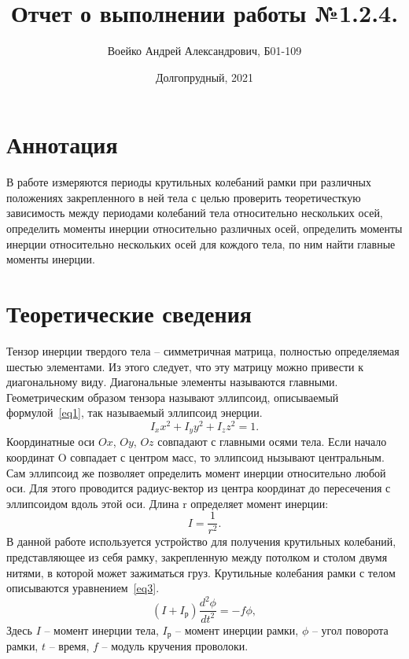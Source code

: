 \documentclass[a4paper,11pt]{article}
\title{Отчет о выполнении работы №1.2.4.}
\author{Воейко Андрей Александрович, Б01-109}
\date{Долгопрудный, 2021}
\begin{document}
\maketitle
\newpage
\section{Аннотация}
В работе измеряются периоды крутильных колебаний рамки при различных положениях закрепленного в ней тела с целью проверить теоретичесткую зависимость между периодами колебаний тела относительно нескольких осей, определить моменты инерции относительно различных осей, определить моменты инерции относительно нескольких осей для кождого тела, по ним найти главные моменты инерции.
\section{Теоретические сведения}
Тензор инерции твердого тела -- симметричная матрица, полностью определяемая шестью элементами. Из этого следует, что эту матрицу можно привести к диагональному виду. Диагональные элементы называются главными. Геометрическим образом тензора называют эллипсоид, описываемый формулой~\ref{eq1}, так называемый эллипсоид энерции.\newline
\begin{equation}    \label{eq1}
  I_{x}x^{2} + I_{y}y^{2}+ I_{z}z^{2} = 1.
\end{equation}
Координатные оси $Ox$, $Oy$, $Oz$ совпадают с главными осями тела. Если начало координат O совпадает с центром масс, то эллипсоид нызывают центральным. Сам эллипсоид же позволяет определить момент инерции относительно любой оси. Для этого проводится радиус-вектор из центра координат до пересечения с эллипсоидом вдоль этой оси. Длина r определяет момент инерции:\newline
\begin{equation}    \label{eq2}
  I = \frac{1}{r^{2}}.
\end{equation}
В данной работе используется устройство для получения крутильных колебаний, представляющее из себя рамку, закрепленную между потолком и столом двумя нитями, в которой может зажиматься груз. Крутильные колебания рамки с телом описываются уравнением~\ref{eq3}.\newline
\begin{equation}    \label{eq3}
  (I + I_{р}) \frac{d^{2}\phi}{dt^{2}} = -f\phi,
\end{equation}
Здесь $I$ -- момент инерции тела, $I_{р}$ -- момент инерции рамки, $\phi$ -- угол поворота рамки, $t$ -- время, $f$ -- модуль кручения проволоки.\newline
\end{document}

